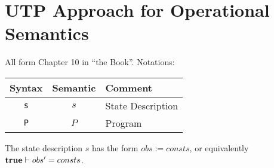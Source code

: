\section{UTP Approach for Operational Semantics}

All form Chapter 10 in ``the Book''.
Notations:

\begin{tabular}{|c|c|l|}
\hline
  Syntax & Semantic & Comment
\\\hline
  \texttt{s} & $s$ & State Description
\\\hline
  \texttt{P} & $P$ & Program
\\\hline
\end{tabular}

The state description $s$ has the form $obs:=consts$,
or equivalently $\mathbf{true} \vdash obs'=consts$.


